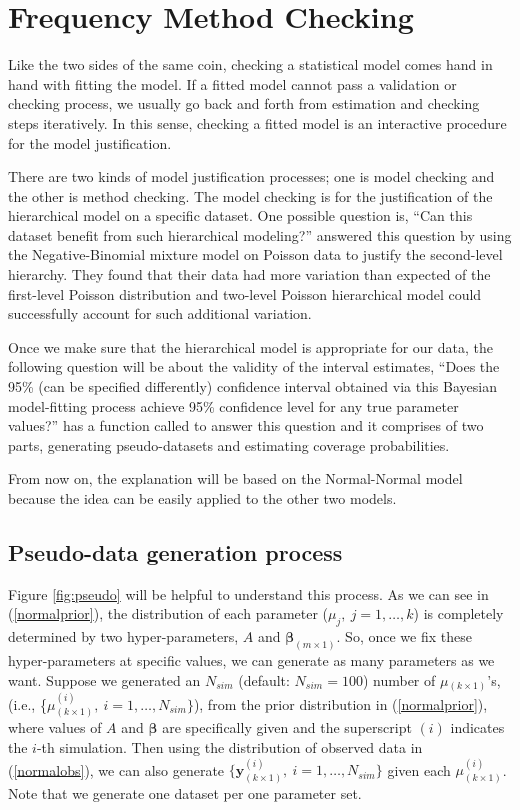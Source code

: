 \documentclass[article]{jss}
\begin{document}
\section[Frequency method checking]{Frequency Method Checking}\label{sec4}
Like the two sides of the same coin, checking a statistical model comes hand in hand with fitting the model. If a fitted model cannot pass a validation or checking process, we usually go back and forth from estimation and checking steps iteratively. In this sense, checking a fitted model is an interactive procedure for the model justification.


There are two kinds of model justification processes; one is model checking and the other is method checking. The model checking is for the justification of the hierarchical model on a specific dataset. One possible question is, ``Can this dataset benefit from such hierarchical modeling?'' \cite{modelchecking1996} answered this question by using the Negative-Binomial mixture model on Poisson data to justify the second-level hierarchy. They found that their data had more variation than expected of the first-level Poisson distribution and two-level Poisson hierarchical model could successfully account for such additional variation.


Once we make sure that the hierarchical model is appropriate for our data, the following question will be about the validity of the interval estimates, ``Does the 95\% (can be specified differently) confidence interval obtained via this Bayesian model-fitting process achieve 95\% confidence level  for any true parameter values?''  has a function called  to answer this question and it comprises of two parts, generating pseudo-datasets and estimating coverage probabilities.

From now on, the explanation will be based on the Normal-Normal model because the idea can be easily applied to the other two models.

\subsection{Pseudo-data generation process}
Figure \ref{fig:pseudo} will be helpful to understand this process. As we can see in (\ref{normalprior}), the distribution of each parameter ($\mu_{j},~j=1,\ldots, k$) is completely determined by two hyper-parameters, $A$ and $\boldsymbol{\beta}_{(m\times1)}$. So, once we fix these hyper-parameters at specific values, we can generate as many parameters as we want. Suppose we generated an $N_{sim}$ (default: $N_{sim} = 100$) number of {\boldmath $\mu$}$_{(k\times1)}$'s, (i.e., \{{\boldmath $\mu$}$^{(i)}_{(k\times1)},~i=1, \ldots, N_{sim}\}$), from the prior distribution in (\ref{normalprior}), where values of $A$ and $\boldsymbol{\beta}$ are specifically given and the superscript $(i)$ indicates the $i$-th simulation. Then using the distribution of observed data in (\ref{normalobs}), we can also generate $\{\boldsymbol{y}^{(i)}_{(k\times1)},~i=1, \ldots, N_{sim}\}$ given each {\boldmath$\mu$}$^{(i)}_{(k\times1)}$. Note that we generate one dataset per one parameter set.
\end{document}
